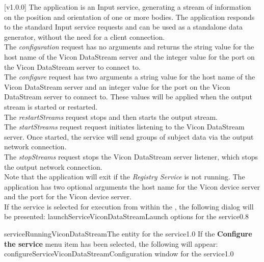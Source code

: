 [v1.0.0]
The  application is an Input service,
generating a stream of information on the position and orientation of one or more bodies.
The application responds to the standard Input service requests and can be used as a
standalone data generator, without the need for a client connection.\\

The \emph{configuration} request has no arguments and returns the string value for the
host name of the Vicon DataStream server and the integer value for the port on the Vicon
DataStream server to connect to.\\

The \emph{configure} request has two arguments \longDash{} a string value for the host
name of the Vicon DataStream server and an integer value for the port on the Vicon
DataStream server to connect to.
These values will be applied when the output stream is started or restarted.\\ 

The \emph{restartStreams} request stops and then starts the output stream.\\

The \emph{startStreams} request request initiates listening to the Vicon DataStream
server.
Once started, the service will send groups of subject data via the output \yarp{} network
connection.\\

The \emph{stopStreams} request stops the Vicon DataStream server listener, which stops the
output \yarp{} network connection.\\ 

Note that the application will exit if the \emph{Registry Service} is not running.
The application has two optional arguments \longDash{} the host name for the Vicon device
server and the port for the Vicon device server.
\insertAppParameters
\insertTagDescription{\VDSI}
\insertInputServiceComment\\

\insertStandardServiceCommands
\secondaryEnd
\condPage
{}
If the service is selected for execution from within the \emph{\MMMU}, the following
dialog will be presented:
%
{launchServiceViconDataStream}{Launch options for the \VDSI{} service}{0.8}

%
{serviceRunningViconDataStream}{The \emph{\MMMU} entity for the \VDSI{} service}{1.0}
\condPage{}
If the \textbf{Configure the service} menu item has been selected, the following will
appear:
%
{configureServiceViconDataStream}{Configuration window for the \emph{\VDSI} service}{1.0}
\secondaryEnd
\primaryEnd{}
